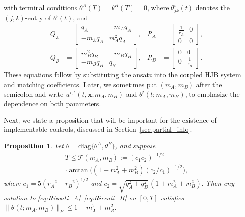 \documentclass[letterpaper, 10 pt, conference]{ieeeconf}
\newcommand{\diag}{\mathrm{diag}}
\newtheorem{proposition}{Proposition}
\begin{document}
with terminal conditions $\theta^A(T) = \theta^B(T) = 0$, where \(\theta_{jk}^i(t)\) denotes the \((j,k)\)-entry of \(\theta^i(t)\), and 
\begin{align*}
    Q_A &= \begin{bmatrix} q_A & -m_A q_A \\ -m_A q_A & m_A^2 q_A \end{bmatrix}, &
    R_A &= \begin{bmatrix} \tfrac{1}{r_A} & 0 \\ 0 & 0 \end{bmatrix}, \\
    Q_B &= \begin{bmatrix} m_B^2 q_B & -m_B q_B \\ -m_B q_B & q_B \end{bmatrix}, &
    R_B &= \begin{bmatrix} 0 & 0 \\ 0 & \tfrac{1}{r_B} \end{bmatrix}.
\end{align*}
These equations follow by substituting the ansatz into the coupled HJB system and matching coefficients. Later, we sometimes  put $(m_A, m_B)$ after the semicolon and write $u^{i,*}(t,\bm{x}; m_A, m_B)$ and $\theta^i(t; m_A, m_B)$, to emphasize the dependence on both parameters. 


Next, we state a proposition that will be important for the existence of implementable controls, discussed in Section~\ref{sec:partial_info}. 



\begin{proposition}\label{prop:theta_bound}
    Let $\theta = \diag\{\theta^A, \theta^B\}$, and suppose \vspace{-0.3em}    
    \begin{multline}\label{eq:T_bound}
        T \leq \mathcal{T}(m_A, m_B)
        := (c_1 c_2)^{-1/2}  \\ \cdot\arctan \big((1+m_A^2 + m_B^2)(c_2/c_1)^{-1/2}\big),
    \end{multline}
    where $c_1 = 5 (r_A^{-2} + r_B^{-2})^{1/2}$ and $c_2= \sqrt{q_A^2 + q_B^2}\,(1 + m_A^2 + m_B^2).$ 
    Then any solution to \eqref{eq:Riccati_A}--\eqref{eq:Riccati_B} on $[0,T]$ satisfies $\big\|\theta(t; m_A, m_B)\big\|_F \le 1 + m_A^2 + m_B^2$. 
\end{proposition}
\end{document}
